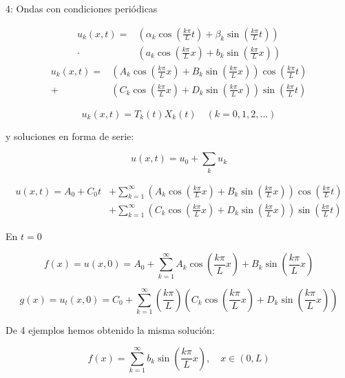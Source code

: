 \begin{example}{4: Ondas con condiciones periódicas}

			\begin{align*}
			u_k(x,t) = &\left(\alpha_k \cos \left( \frac{k \pi}{L} t \right) + \beta_k \sin \left( \frac{k \pi}{L} t \right) \right) \\
			\cdot &\left(a_k \cos \left( \frac{k \pi}{L} x \right) + b_k \sin \left( \frac{k \pi}{L} x \right) \right)
			\end{align*}
			\begin{align*}
			u_k(x,t) = &\left(A_k \cos \left( \frac{k \pi}{L} x \right) + B_k \sin \left( \frac{k \pi}{L} x \right) \right) \cos \left( \frac{k \pi}{L} t \right)\\
			+ &\left(C_k \cos \left( \frac{k \pi}{L} x \right) + D_k \sin \left( \frac{k \pi}{L} x \right) \right) \sin \left( \frac{k \pi}{L} t \right)
			\end{align*}




			\[u_k(x,t) = T_k(t) X_k(t) \quad (k=0,1,2,…)\]


			y soluciones en forma de serie:

			\[ u(x,t) = u_0 + \sum_k u_k \]

			\begin{align*}
				u(x,t) = A_0 + C_0 t &+ \sum^{\infty}_{k=1} \left(A_k \cos \left( \frac{k \pi}{L} x \right) + B_k \sin \left( \frac{k \pi}{L} x \right) \right) \cos \left( \frac{k \pi}{L} t \right)\\
				&+ \sum^{\infty}_{k=1} \left(C_k \cos \left( \frac{k \pi}{L} x \right) + D_k \sin \left( \frac{k \pi}{L} x \right) \right) \sin \left( \frac{k \pi}{L} t \right)
			\end{align*}

			En $t = 0$

			\[f(x) = u(x,0) = A_0 + \sum_{k=1}^{\infty} A_k \cos \left( \frac{k \pi}{L} x \right) + B_k \sin \left( \frac{k \pi}{L} x \right) \]

			\[g(x) = u_t (x,0) = C_0 + \sum_{k=1}^{\infty} \left(\frac{k \pi}{L}\right) \left( C_k \cos \left( \frac{k \pi}{L} x \right) + D_k \sin \left( \frac{k \pi}{L} x \right)\right) \]


		\end{example}

		De 4 ejemplos hemos obtenido la misma solución:

		\[ f(x) = \sum_{k=1}^{\infty} b_k \sin \left( \frac{k \pi}{L} x \right), \quad x \in (0,L) \]

